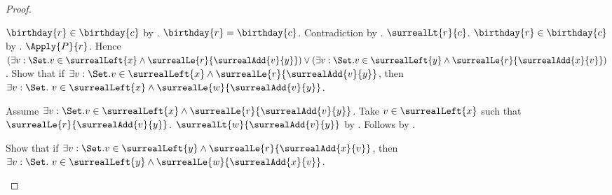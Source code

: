 \begin{proof}
\begin{subproof}
\begin{subproof}
\begin{subproof}
\begin{byCase}
                    \begin{byCase}
                            $\birthday{r}\in\birthday{c}$
                                by .
                            $\birthday{r}=\birthday{c}$.
                            Contradiction by .
                            $\surrealLt{r}{c}$.
                            $\birthday{r}\in\birthday{c}$
                                by .
                            $\Apply{P}{r}$.
                            Hence $(\exists v:\Set.
                                    v\in\surrealLeft{x}\land
                                    \surrealLe{r}{\surrealAdd{v}{y}})
                                \lor
                                (\exists v:\Set.
                                    v\in\surrealLeft{y}\land
                                    \surrealLe{r}{\surrealAdd{x}{v}})$.
                            Show that if $\exists v:\Set.
                                    v\in\surrealLeft{x}\land
                                    \surrealLe{r}{\surrealAdd{v}{y}}$, then
                                $\exists v:\Set.\ v\in\surrealLeft{x}\land
                                    \surrealLe{w}{\surrealAdd{v}{y}}$.
                            \begin{subproof}
                                Assume $\exists v:\Set.
                                    v\in\surrealLeft{x}\land
                                    \surrealLe{r}{\surrealAdd{v}{y}}$.
                                Take $v\in\surrealLeft{x}$ such that
                                    $\surrealLe{r}{\surrealAdd{v}{y}}$.
                                $\surrealLt{w}{\surrealAdd{v}{y}}$
                                    by .
                                Follows by .
                            \end{subproof}
                            Show that if $\exists v:\Set.
                                    v\in\surrealLeft{y}\land
                                    \surrealLe{r}{\surrealAdd{x}{v}}$, then
                                $\exists v:\Set.\ v\in\surrealLeft{y}\land
                                    \surrealLe{w}{\surrealAdd{x}{v}}$.
\end{byCase}
\end{byCase}
\end{subproof}
\end{subproof}
\end{subproof}
\end{proof}
